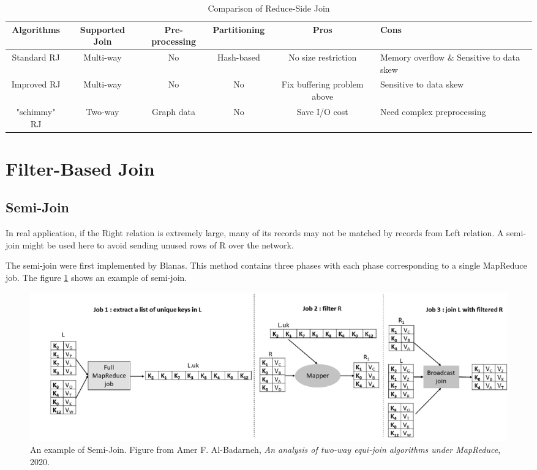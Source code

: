 \documentclass[sigconf, nonacm]{acmart}
\begin{document}
\begin{table}[hbt!]
  \caption{Comparison of Reduce-Side Join}
  \label{tab:3}
  \begin{tabular}{|c|c|c|c|c|l|}
    \toprule
    Algorithms & Supported Join & Pre-processing &  Partitioning & Pros & Cons\\
    \hline\hline
    Standard RJ & Multi-way  & No & Hash-based & No size restriction & Memory overflow \& Sensitive to data skew \\
    \hline
    Improved RJ & Multi-way & No & No & Fix buffering problem above & Sensitive to data skew\\
    \hline
    "schimmy" RJ & Two-way & Graph data & No & Save I/O cost & Need complex preprocessing\\
    
    \bottomrule
  \end{tabular}
\end{table}

\section{Filter-Based Join}
\subsection{Semi-Join}
In real application, if the Right relation is extremely large, many of its records may not be matched by records from Left relation. A semi-join might be used here to avoid sending unused rows of R over the network. 

The semi-join were first implemented by Blanas\cite{blanas2010comparison}. This method contains three phases with each phase corresponding to a single MapReduce job. The figure \ref{fig:5} shows an example of semi-join. 

\begin{figure}[hbt!]
  \centering
  \includegraphics[width=\linewidth]{figures/5.png}
  \caption{An example of Semi-Join.  Figure from Amer F. Al-Badarneh, \textit{An analysis of two-way equi-join algorithms under MapReduce}, 2020.}
  \label{fig:5}
\end{figure}
\end{document}
